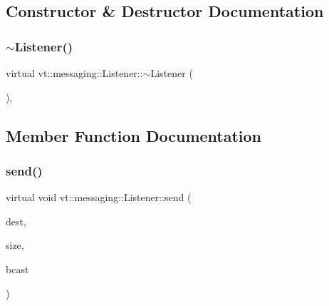 \subsection{Constructor \& Destructor Documentation}
\mbox{\label{structvt_1_1messaging_1_1_listener_aee8a1131c7427cb1f8e2005605f2718c}} 
\subsubsection{\texorpdfstring{$\sim$\+Listener()}{~Listener()}}
{\footnotesize\ttfamily virtual vt\+::messaging\+::\+Listener\+::$\sim$\+Listener (\begin{DoxyParamCaption}{ }\end{DoxyParamCaption})\hspace{0.3cm}{\ttfamily [inline]}, {\ttfamily [virtual]}}



\subsection{Member Function Documentation}
\mbox{\label{structvt_1_1messaging_1_1_listener_ab2b334277feecb181a28f613c68bfc53}} 
\subsubsection{\texorpdfstring{send()}{send()}}
{\footnotesize\ttfamily virtual void vt\+::messaging\+::\+Listener\+::send (\begin{DoxyParamCaption}\item[{\hyperlink{namespacevt_a866da9d0efc19c0a1ce79e9e492f47e2}{Node\+Type}}]{dest,  }\item[{\hyperlink{namespacevt_abfa009d900299ac1df967b40ea8f2c8a}{Msg\+Size\+Type}}]{size,  }\item[{bool}]{bcast }\end{DoxyParamCaption})\hspace{0.3cm}{\ttfamily [pure virtual]}}



